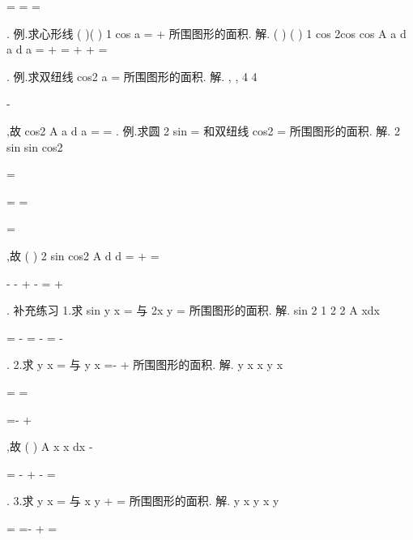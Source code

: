 =
=
=




\int 
. 
\textcolor{lyred}{例}.求心形线
(
)(
)
1 cos
a
\rho 
\theta 
\theta 
\pi 
=
+
\le 
\le 
所围图形的面积. 
解.
(
)
(
)
1 cos
2cos
cos
A
a
d
a
d
a
\pi 
\pi 
\theta 
\theta 
\theta 
\theta 
\theta 
\pi 
=
\cdots 
+
=
+
+
=




\int 
\int 
. 
\textcolor{lyred}{例}.求双纽线
cos2
a
\rho 
\theta 
=
所围图形的面积. 
解.
,
,
4 4
\pi \pi 
\pi 
\pi 
\theta 




\in -
\cup 








,故
cos2
A
a
d
a
\pi 
\theta \theta 
=
\cdots 
=
\int 
. 
\textcolor{lyred}{例}.求圆
2 sin
\rho 
\theta 
=
和双纽线
cos2
\rho 
\theta 
=
所围图形的面积. 
解.
2 sin
sin
cos2
\pi 
\rho 
\theta 
\theta 
\theta 
\rho 
\theta 

=

\Rightarrow 
=
\Rightarrow 
=

=

,故
(
)
2 sin
cos2
A
d
d
\pi 
\pi 
\pi 
\theta 
\theta 
\theta \theta 
=
+
=
\int 
\int 
\pi 
\pi 




-
-
+
-
=
+












. 
\textcolor{lyred}{补充练习 }
1.求
sin
y
x
=
与
2x
y
\pi 
=
所围图形的面积. 
解.
sin
2 1
2 2
A
xdx
\pi 
\pi 
\pi 
\pi 






=
-
\cdots 
=
-
=
-










\int 
. 
2.求
y
x
=
与
y
x
=-
+
所围图形的面积. 
解.
y
x
x
y
x

=
\Rightarrow 
=\pm 

=-
+

,故
(
)
A
x
x
dx
-


=
-
+
-
=


\int 
. 
3.求
y
x
=
与
x
y
+
=
所围图形的面积. 
解.
y
x
y
x
y

=
\Rightarrow 
=-
+
=

